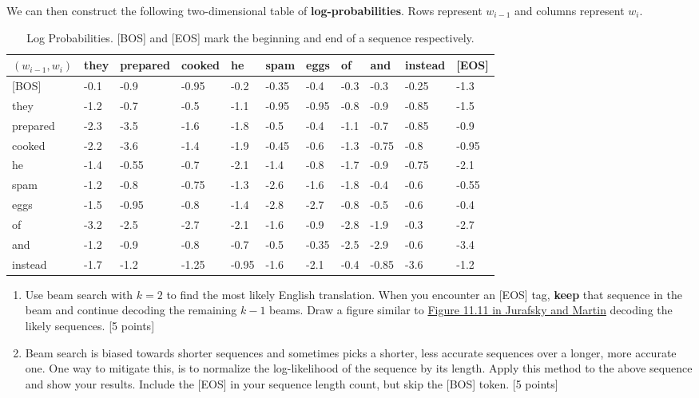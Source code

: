 \documentclass[twoside,10pt]{article}
\begin{document}
We can then construct the following two-dimensional table of \textbf{log-probabilities}. Rows represent $w_{i-1}$ and columns represent $w_i$.

\begin{table}[h!]
\centering
\begin{tabular}{@{}lllllllllll@{}}
\toprule
$(w_{i-1}, w_i)$ & they & prepared & cooked & he    & spam  & eggs  & of   & and   & instead & {[}EOS{]} \\ \midrule
{[}BOS{]}      & -0.1 & -0.9     & -0.95  & -0.2  & -0.35 & -0.4  & -0.3 & -0.3  & -0.25   & -1.3      \\
they           & -1.2 & -0.7     & -0.5   & -1.1  & -0.95  & -0.95 & -0.8 & -0.9  & -0.85   & -1.5      \\
prepared       & -2.3 & -3.5     & -1.6   & -1.8  & -0.5  & -0.4  & -1.1 & -0.7  & -0.85   & -0.9      \\
cooked         & -2.2 & -3.6     & -1.4   & -1.9  & -0.45 & -0.6  & -1.3 & -0.75 & -0.8    & -0.95     \\
he             & -1.4 & -0.55     & -0.7   & -2.1  & -1.4  & -0.8  & -1.7 & -0.9  & -0.75   & -2.1      \\
spam           & -1.2 & -0.8     & -0.75  & -1.3  & -2.6  & -1.6  & -1.8 & -0.4  & -0.6    & -0.55      \\
eggs           & -1.5 & -0.95    & -0.8   & -1.4  & -2.8  & -2.7  & -0.8 & -0.5  & -0.6    & -0.4      \\
of             & -3.2 & -2.5     & -2.7   & -2.1  & -1.6  & -0.9  & -2.8 & -1.9  & -0.3    & -2.7      \\
and            & -1.2 & -0.9     & -0.8   & -0.7  & -0.5  & -0.35 & -2.5 & -2.9  & -0.6    & -3.4      \\
instead        & -1.7 & -1.2     & -1.25  & -0.95 & -1.6  & -2.1  & -0.4 & -0.85 & -3.6    & -1.2      \\ \bottomrule
\end{tabular}
\caption{Log Probabilities. {[}BOS{]} and {[}EOS{]} mark the beginning and end of a sequence respectively.}
\end{table}

\begin{enumerate}[label=(\alph*)]
    \item Use beam search with $k=2$ to find the most likely English translation. When you encounter an {[}EOS{]} tag, \textbf{keep} that sequence in the beam and continue decoding the remaining $k-1$ beams. Draw  a figure similar to \href{https://web.stanford.edu/~jurafsky/slp3/11.pdf}{Figure 11.11 in Jurafsky and Martin} decoding the likely sequences. [5 points]
    \item Beam search is biased towards shorter sequences and sometimes picks a shorter, less accurate sequences over a longer, more accurate one. One way to mitigate this, is to normalize the log-likelihood of the sequence by its length. Apply this method to the above sequence and show your results. Include the {[}EOS{]} in your sequence length count, but skip the {[}BOS{]} token. [5 points]
\end{enumerate}
\end{document}
